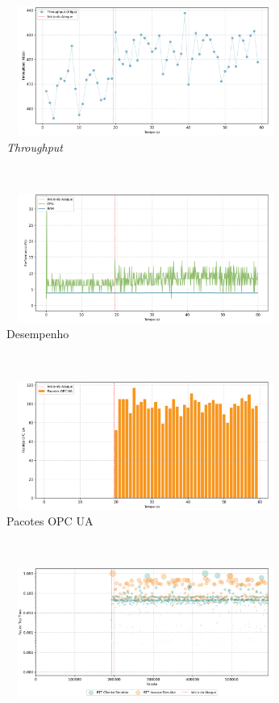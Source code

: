 \begin{apendicesenv}
\begin{figure}[htbp!]
    \centering
    \begin{subfigure}[t]{0.5\textwidth}
        \centering
        \includegraphics[width=1\textwidth, height=120pt]{USPSC-img/output/cropped/1-mitm_port-tput.png}
        \caption{\textit{Throughput}}
    \end{subfigure}%
    ~ 
    \begin{subfigure}[t]{0.5\textwidth}
        \centering
        \includegraphics[width=1\textwidth, height=120pt]{USPSC-img/output/cropped/1-mitm_port-perf.png}
        \caption{Desempenho}
    \end{subfigure}%
    \\
    \begin{subfigure}[t]{0.5\textwidth}
        \centering
        \includegraphics[width=1\textwidth, height=120pt]{USPSC-img/output/cropped/1-mitm_port-pack.png}
        \caption{Pacotes OPC UA}
    \end{subfigure}%
    ~
    \begin{subfigure}[t]{0.5\textwidth}
        \centering
        \includegraphics[width=1\textwidth, height=120pt]{USPSC-img/output/cropped/1-mitm_port-rttp.png}

\end{subfigure}
\end{figure}
\end{apendicesenv}
